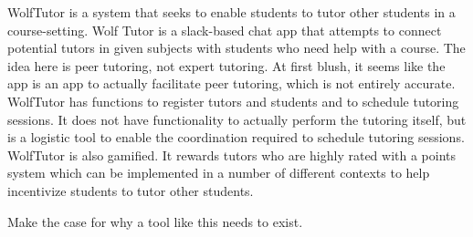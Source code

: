 WolfTutor is a system that seeks to enable students to tutor other
students in a course-setting.  Wolf Tutor is a slack-based chat app
that attempts to connect potential tutors in given subjects with
students who need help with a course.  The idea here is peer tutoring,
not expert tutoring.  At first blush, it seems like the app is an app
to actually facilitate peer tutoring, which is not entirely accurate.
WolfTutor has functions to register tutors and students and to
schedule tutoring sessions.  It does not have functionality to
actually perform the tutoring itself, but is a logistic tool to enable
the coordination required to schedule tutoring sessions.  WolfTutor is
also gamified.  It rewards tutors who are highly rated with a points
system which can be implemented in a number of different contexts to
help incentivize students to tutor other students.

Make the case for why a tool like this needs to exist.
